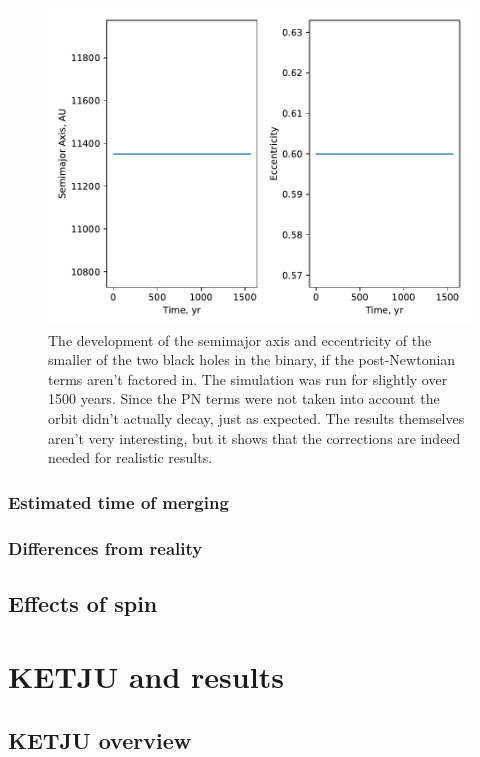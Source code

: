 \documentclass[english, oneside]{HYgradu}
\begin{document}
\begin{figure}[h!tb]
\centering
\includegraphics[width=\textwidth]{../images/noPN.pdf}
\caption{The development of the semimajor axis and eccentricity of the smaller of the two black holes in the binary, if the post-Newtonian terms aren't factored in. The simulation was run for slightly over 1500 years. Since the PN terms were not taken into account the orbit didn't actually decay, just as expected. The results themselves aren't very interesting, but it shows that the corrections are indeed needed for realistic results.}
\label{fig:noPN}
\end{figure}

\subsection{Estimated time of merging}
\subsection{Differences from reality}
\section{Effects of spin}

\chapter{KETJU and results}
\section{KETJU overview}
\end{document}
